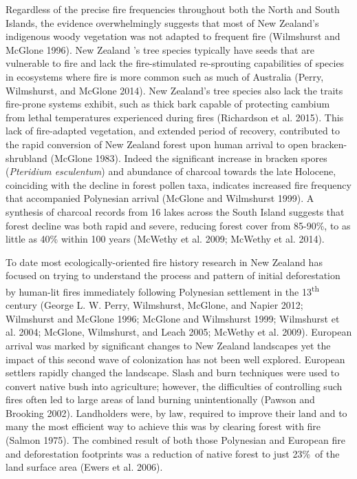 \documentclass[]{article}
\begin{document}
Regardless of the precise fire frequencies throughout both the North and South Islands, the evidence overwhelmingly suggests that most of New Zealand's indigenous woody vegetation was not adapted to frequent fire (Wilmshurst and McGlone 1996). New Zealand 's tree species typically have seeds that are vulnerable to fire and lack the fire-stimulated re-sprouting capabilities of species in ecosystems where fire is more common such as much of Australia (Perry, Wilmshurst, and McGlone 2014). New Zealand's tree species also lack the traits fire-prone systems exhibit, such as thick bark capable of protecting cambium from lethal temperatures experienced during fires (Richardson et al. 2015). This lack of fire-adapted vegetation, and extended period of recovery, contributed to the rapid conversion of New Zealand forest upon human arrival to open bracken-shrubland (McGlone 1983). Indeed the significant increase in bracken spores (\emph{Pteridium esculentum}) and abundance of charcoal towards the late Holocene, coinciding with the decline in forest pollen taxa, indicates increased fire frequency that accompanied Polynesian arrival (McGlone and Wilmshurst 1999). A synthesis of charcoal records from 16 lakes across the South Island suggests that forest decline was both rapid and severe, reducing forest cover from 85-90\%, to as little as 40\% within 100 years (McWethy et al. 2009; McWethy et al. 2014).

To date most ecologically-oriented fire history research in New Zealand has focused on trying to understand the process and pattern of initial deforestation by human-lit fires immediately following Polynesian settlement in the 13\textsuperscript{th} century (George L. W. Perry, Wilmshurst, McGlone, and Napier 2012; Wilmshurst and McGlone 1996; McGlone and Wilmshurst 1999; Wilmshurst et al. 2004; McGlone, Wilmshurst, and Leach 2005; McWethy et al. 2009). European arrival was marked by significant changes to New Zealand landscapes yet the impact of this second wave of colonization has not been well explored. European settlers rapidly changed the landscape. Slash and burn techniques were used to convert native bush into agriculture; however, the difficulties of controlling such fires often led to large areas of land burning unintentionally (Pawson and Brooking 2002). Landholders were, by law, required to improve their land and to many the most efficient way to achieve this was by clearing forest with fire (Salmon 1975). The combined result of both those Polynesian and European fire and deforestation footprints was a reduction of native forest to just 23\%~of the land surface area (Ewers et al. 2006).
\end{document}
